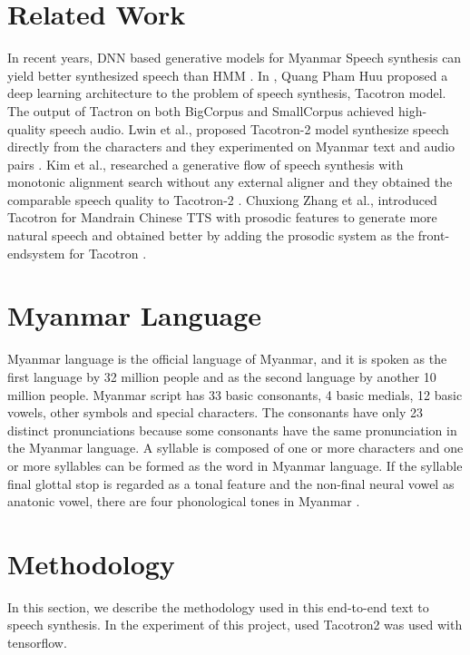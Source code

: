 \documentclass[journal,transmag]{JIISTjrnl}
\begin{document}
\section{Related Work} 
In recent years, DNN based generative models for Myanmar Speech synthesis can yield better synthesized speech than HMM \cite{b1}. In \cite{b2}, Quang Pham Huu proposed a deep learning architecture to the problem of speech synthesis, Tacotron model. The output of Tactron on both BigCorpus and SmallCorpus achieved high-quality speech audio. Lwin et al., proposed Tacotron-2 model synthesize speech directly from the characters and they experimented on Myanmar text and audio pairs \cite{b3}. Kim et al., researched a generative flow of speech synthesis with monotonic alignment search without any external aligner and they obtained the comparable speech quality to Tacotron-2 \cite{b4}. Chuxiong Zhang et al., introduced Tacotron for Mandrain Chinese TTS with prosodic features to generate more natural speech and obtained better by adding the prosodic system as the front-endsystem for Tacotron \cite{b6}. 
\section{Myanmar Language}
Myanmar language is the official language of Myanmar, and it is spoken as the first language by 32 million people and as the second language by another 10 million people. Myanmar script has 33 basic consonants, 4 basic medials, 12 basic vowels, other symbols and special characters. The consonants have only 23 distinct pronunciations because some consonants have the same pronunciation in the Myanmar language. A syllable is composed of one or more characters and one or more syllables can be formed as the word in Myanmar language. If the syllable final glottal stop is regarded as a tonal feature and the non-final neural vowel as anatonic vowel, there are four phonological tones in Myanmar \cite{b5}. 

\section{Methodology}
In this section, we describe the methodology used in this end-to-end text to speech synthesis. In the experiment of this project, used Tacotron2 was used with tensorflow.  
\end{document}
